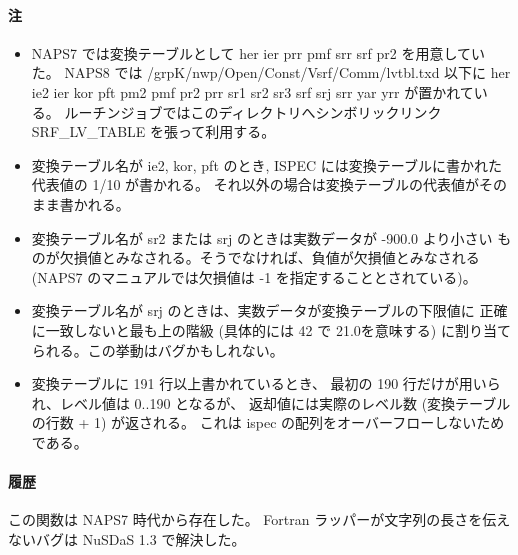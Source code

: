 \paragraph{注}
\begin{itemize}
\item 
NAPS7 では変換テーブルとして
her ier prr pmf srr srf pr2
を用意していた。
NAPS8 では \newline 
/grpK/nwp/Open/Const/Vsrf/Comm/lvtbl.txd 以下に
her ie2 ier kor pft pm2 pmf pr2 prr sr1 sr2 sr3 srf srj srr yar yrr
が置かれている。
ルーチンジョブではこのディレクトリへシンボリックリンク SRF\_LV\_TABLE
を張って利用する。
\item 
変換テーブル名が ie2, kor, pft のとき,
ISPEC には変換テーブルに書かれた代表値の 1/10 が書かれる。
それ以外の場合は変換テーブルの代表値がそのまま書かれる。
\item 
変換テーブル名が sr2 または srj のときは実数データが -900.0 より小さい
ものが欠損値とみなされる。そうでなければ、負値が欠損値とみなされる
(NAPS7 のマニュアルでは欠損値は -1 を指定することとされている)。
\item 
変換テーブル名が srj のときは、実数データが変換テーブルの下限値に
正確に一致しないと最も上の階級 (具体的には 42 で 21.0を意味する)
に割り当てられる。この挙動はバグかもしれない。
\item 
変換テーブルに 191 行以上書かれているとき、
最初の 190 行だけが用いられ、レベル値は 0..190 となるが、
返却値には実際のレベル数 (変換テーブルの行数 + 1) が返される。
これは ispec の配列をオーバーフローしないためである。
\end{itemize}
\paragraph{履歴}
この関数は NAPS7 時代から存在した。
Fortran ラッパーが文字列の長さを伝えないバグは NuSDaS 1.3 で解決した。

